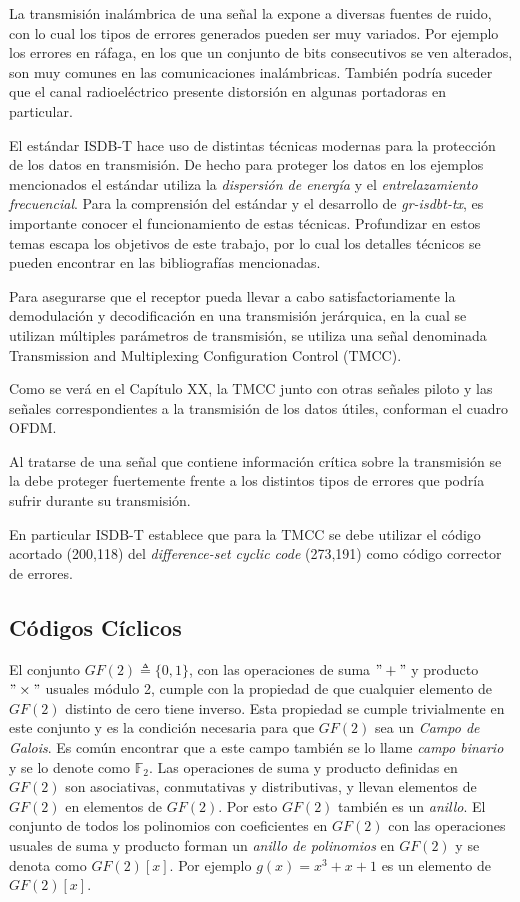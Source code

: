 La transmisión inalámbrica de una señal la expone a diversas fuentes de ruido, con lo cual los tipos de errores generados pueden ser muy variados. Por ejemplo los errores en ráfaga, en los que un conjunto de bits consecutivos se ven alterados, son muy comunes en las comunicaciones inalámbricas. También podría suceder que el canal radioeléctrico presente distorsión en algunas portadoras en particular.

El estándar ISDB-T hace uso de distintas técnicas modernas para la protección de los datos en transmisión. De hecho para proteger los datos en los ejemplos mencionados el estándar utiliza la \textit{dispersión de energía} y el  \textit{entrelazamiento frecuencial}. Para la comprensión del estándar y el desarrollo de \textit{gr-isdbt-tx}, es importante conocer el funcionamiento de estas técnicas. Profundizar en estos temas escapa los objetivos de este trabajo, por lo cual los detalles técnicos se pueden encontrar en las bibliografías mencionadas.

Para asegurarse que el receptor pueda llevar a cabo satisfactoriamente la demodulación y decodificación en una transmisión jerárquica, en la cual se utilizan múltiples parámetros de transmisión, se utiliza una señal denominada Transmission and Multiplexing Configuration Control (TMCC).

Como se verá en el Capítulo XX, la TMCC junto con otras señales piloto y las señales correspondientes a la transmisión de los datos útiles, conforman el cuadro OFDM.

Al tratarse de una señal que contiene información crítica sobre la transmisión se la debe proteger fuertemente frente a los distintos tipos de errores que podría sufrir durante su transmisión.

En particular ISDB-T establece que para la TMCC se debe utilizar el código acortado (200,118) del \textit{difference-set cyclic code} (273,191) como código corrector de errores.

\subsection{Códigos Cíclicos}
El conjunto $GF(2) \triangleq \{0,1\}$, con las operaciones de suma $" + "$ y producto $" \times "$ usuales módulo 2, cumple con la propiedad de que cualquier elemento de $GF(2)$ distinto de cero tiene inverso. Esta propiedad se cumple trivialmente en este conjunto y es la condición necesaria para que $GF(2)$ sea un \textit{Campo de Galois}. Es común encontrar que a este campo también se lo llame \textit{campo binario} y se lo denote como $\mathbb {F}_2$.
Las operaciones de suma y producto definidas en $GF(2)$ son asociativas, conmutativas y distributivas, y llevan elementos de $GF(2)$ en elementos de $GF(2)$. Por esto $GF(2)$ también es un \textit{anillo}. 
El conjunto de todos los polinomios con coeficientes en $GF(2)$ con las operaciones usuales de suma y producto forman un \textit{anillo de polinomios} en $GF(2)$ y se denota como $GF(2)[x]$. Por ejemplo $g(x) = x^3 + x + 1$ es un elemento de $GF(2)[x]$.

